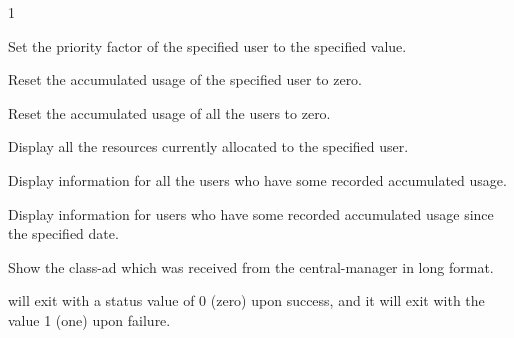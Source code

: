 \begin{ManPage}{\label{man-condor-userprio}}{1}
\begin{Options}
	{Set the priority factor of the specified user to the specified value.}

	{Reset the accumulated usage of the specified user to zero.}

	{Reset the accumulated usage of all the users to zero.}

	{Display all the resources currently allocated to the specified user.}

	{Display information for all the users who have some recorded accumulated usage.}

	{Display information for users who have some recorded accumulated usage since
the specified date.}

	{Show the class-ad which was received from the central-manager in long format.}

\end{Options}

\ExitStatus

 will exit with a status value of 0 (zero) upon success,
and it will exit with the value 1 (one) upon failure.

\end{ManPage}
